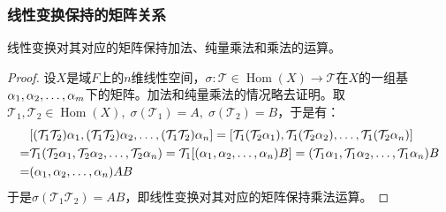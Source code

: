 \subsubsection{线性变换保持的矩阵关系}
\begin{theorem}\label{theo:LinearMappingOperationMatrix}
	线性变换对其对应的矩阵保持加法、纯量乘法和乘法的运算。
\end{theorem}
\begin{proof}
	设$X$是域$F$上的$n$维线性空间，$\sigma:\mathcal{T}\in\operatorname{Hom}(X)\longrightarrow\mathcal{T}$在$X$的一组基$\alpha_1, \alpha_2, \dots, \alpha_{m}$下的矩阵。加法和纯量乘法的情况略去证明。取$\mathcal{T}_1,\mathcal{T}_2\in\operatorname{Hom}(X),\;\sigma(\mathcal{T}_1)=A,\;\sigma(\mathcal{T}_2)=B$，于是有：
	\begin{align*}
		&[(\mathcal{T}_1\mathcal{T}_2)\alpha_1, (\mathcal{T}_1\mathcal{T}_2)\alpha_2, \dots, (\mathcal{T}_1\mathcal{T}_2)\alpha_{n}]
		=[\mathcal{T}_1(\mathcal{T}_2\alpha_1),\mathcal{T}_1(\mathcal{T}_2\alpha_2),\dots,\mathcal{T}_1(\mathcal{T}_2\alpha_n)] \\
		=&\mathcal{T}_1(\mathcal{T}_2\alpha_1, \mathcal{T}_2\alpha_2, \dots, \mathcal{T}_2\alpha_{n}) =\mathcal{T}_1[(\alpha_1, \alpha_2, \dots, \alpha_{n})B] =(\mathcal{T}_1\alpha_1, \mathcal{T}_1\alpha_2, \dots, \mathcal{T}_1\alpha_{n})B \\
		=&(\alpha_1, \alpha_2, \dots, \alpha_{n})AB
	\end{align*}
	于是$\sigma(\mathcal{T}_1\mathcal{T}_2)=AB$，即线性变换对其对应的矩阵保持乘法运算。
\end{proof}
